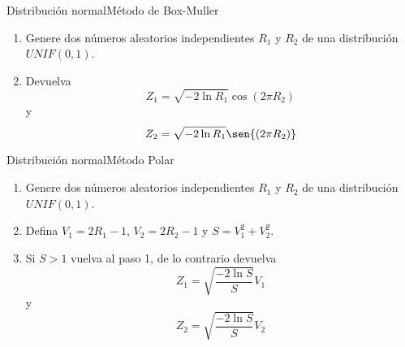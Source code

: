 \begin{frame}{Distribución normal}{Método de Box-Muller}
        \begin{enumerate}
            \item Genere dos números aleatorios independientes $R_1$ y $R_2$  de una distribución $UNIF(0,1)$.
            \item Devuelva \begin{equation*}
                Z_1=\sqrt{-2 \ln{R_1}} \cos{\left(2\pi R_2\right)}
            \end{equation*} y \begin{equation*}
                Z_2=\sqrt{-2 \ln{R_1}} \sen{\left(2\pi R_2\right)}
            \end{equation*}
        \end{enumerate}
\end{frame}

\begin{frame}{Distribución normal}{Método Polar}
    \begin{enumerate}
        \item Genere dos números aleatorios independientes $R_1$ y $R_2$ de una distribución $UNIF(0,1)$.
        \item Defina $V_1=2R_1 - 1$,  $V_2=2R_2 -1$ y $S=V_1^2+V_2^2$.
        \item Si $S>1$ vuelva al paso 1, de lo contrario devuelva \begin{equation*}
            Z_1=\sqrt{\frac{-2 \ln{S}}{S}}V_1
        \end{equation*} y \begin{equation*}
            Z_2=\sqrt{\frac{-2 \ln{S}}{S}}V_2
        \end{equation*}
    \end{enumerate}
\end{frame}

